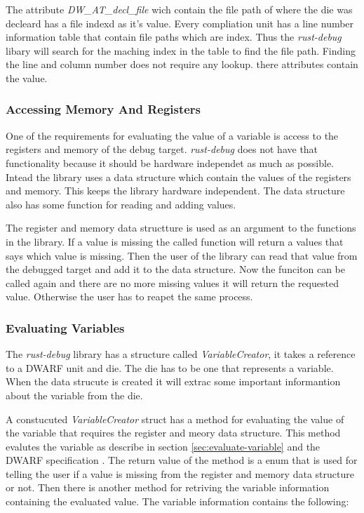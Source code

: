 The attribute  \emph{DW\_AT\_decl\_file} wich contain the file path of where the \gls{die} was decleard has a file indexd as it's value.
Every compliation unit has a line number information table that contain file paths which are index.
Thus the \emph{rust-debug} libary will search for the maching index in the table to find the file path.
Finding the line and column number does not require any lookup. there attributes contain the value.


\subsubsection{Accessing Memory And Registers}
One of the requirements for evaluating the value of a variable is access to the registers and memory of the debug target.
\emph{rust-debug} does not have that functionality because it should be hardware independet as much as possible.
Intead the library uses a data structure which contain the values of the registers and memory.
This keeps the library hardware independent.
The data structure also has some function for reading and adding values.


The register and memory data structture is used as an argument to the functions in the library.
If a value is missing the called function will return a values that says which value is missing.
Then the user of the library can read that value from the debugged target and add it to the data structure.
Now the funciton can be called again and there are no more missing values it will return the requested value.
Otherwise the user has to reapet the same process.


\subsubsection{Evaluating Variables}
The \emph{rust-debug} library has a structure called \emph{VariableCreator}, it takes a reference to a \gls{DWARF} unit and \gls{die}.
The \gls{die} has to be one that represents a variable.
When the data strucute is created it will extrac some important informantion about the variable from the \gls{die}.


A constucuted \emph{VariableCreator} struct has a method for evaluating the value of the variable that requires the register and meory data structure.
This method evalutes the variable as describe in section \ref{sec:evaluate-variable} and the \gls{DWARF} specification \cite{dwarf}.
The return value of the method is a enum that is used for telling the user if a value is missing from the register and memory data structure or not.
Then there is another method for retriving the variable information containing the evaluated value.
The variable information contains the following:


